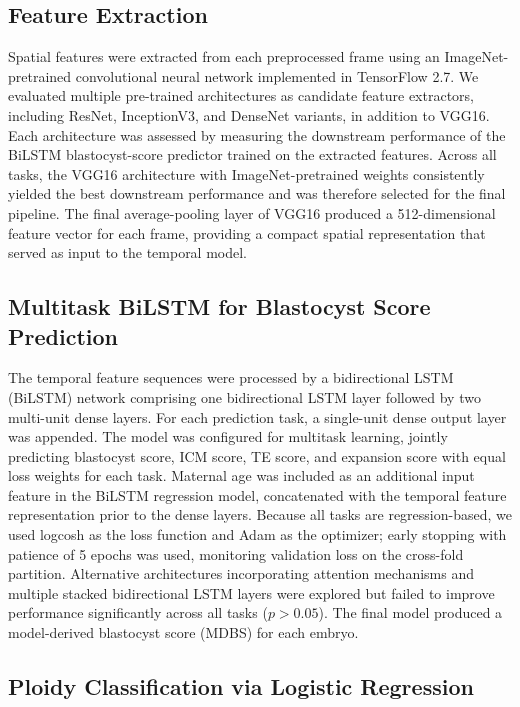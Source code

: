 \documentclass[11pt]{article}
\begin{document}
\subsection{Feature Extraction}

Spatial features were extracted from each preprocessed frame using an ImageNet-pretrained convolutional neural network implemented in TensorFlow 2.7. We evaluated multiple pre-trained architectures as candidate feature extractors, including ResNet, InceptionV3, and DenseNet variants, in addition to VGG16. Each architecture was assessed by measuring the downstream performance of the BiLSTM blastocyst-score predictor trained on the extracted features. Across all tasks, the VGG16 architecture with ImageNet-pretrained weights consistently yielded the best downstream performance and was therefore selected for the final pipeline. The final average-pooling layer of VGG16 produced a 512-dimensional feature vector for each frame, providing a compact spatial representation that served as input to the temporal model.

\subsection{Multitask BiLSTM for Blastocyst Score Prediction}

The temporal feature sequences were processed by a bidirectional LSTM (BiLSTM) network comprising one bidirectional LSTM layer followed by two multi-unit dense layers. For each prediction task, a single-unit dense output layer was appended. The model was configured for multitask learning, jointly predicting blastocyst score, ICM score, TE score, and expansion score with equal loss weights for each task. Maternal age was included as an additional input feature in the BiLSTM regression model, concatenated with the temporal feature representation prior to the dense layers. Because all tasks are regression-based, we used logcosh as the loss function and Adam as the optimizer; early stopping with patience of 5 epochs was used, monitoring validation loss on the cross-fold partition. Alternative architectures incorporating attention mechanisms and multiple stacked bidirectional LSTM layers were explored but failed to improve performance significantly across all tasks ($p > 0.05$). The final model produced a model-derived blastocyst score (MDBS) for each embryo.

\subsection{Ploidy Classification via Logistic Regression}
\end{document}
